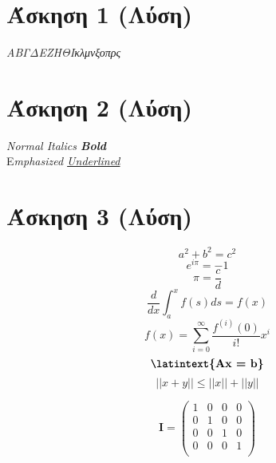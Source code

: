 \documentclass[a4paper,11pt]{article}
\newcommand{\lt}{\latintext}
\begin{document}
\section{Άσκηση 1 (Λύση)}
	
	\begin{center}
		\emph{{\tiny Α}{\scriptsize Β}{\footnotesize Γ}{\small Δ}{\normalsize Ε}{\large Ζ}{\Large Η}{\LARGE Θ}{\huge Ι}{\huge κ}{\LARGE λ}{\Large μ}{\large ν}{\normalsize ξ}{\small ο}{\footnotesize π}{\scriptsize ρ}{\tiny ς}}
	\end{center}

\vspace{20pt}

\section{Άσκηση 2 (Λύση)}

	\begin{center}	
		\lt
		\textit{Normal Italics \textbf{Bold\\}}
		{E}\textit{mphasized \underline{Underlined}}
	\end{center}

\section{Άσκηση 3 (Λύση)}
	
	\begin{equation*}
	a^2 + b^2 = c^2
	\end{equation*}
	\begin{equation*}
	e^{i\pi} = -1
	\end{equation*}
	\begin{equation*}
	\pi = \frac{c}{d}
	\end{equation*}
	\begin{equation*}
	\dfrac{d}{dx}\int_{a}^{x} f(s) ds = f(x)
	\end{equation*}
	\begin{equation*}
	f(x) = \sum_{i=0}^{\infty } {\dfrac{f^{(i)}(0)}{i!} x^i }
	\end{equation*}
	\begin{equation*}
	\textbf{\lt{Ax = b}}
	\end{equation*}
	\begin{equation*}
	||{x+y}||\leq||x||+||y||
	\end{equation*}
	
	\quad
	
	\begin{equation}
	\textbf{I} = 
	\begin{pmatrix}
	1&0&0&0 \\
	0&1&0&0 \\
	0&0&1&0 \\
	0&0&0&1 \\
	\end{pmatrix}
	\end{equation}
	
\end{document}
